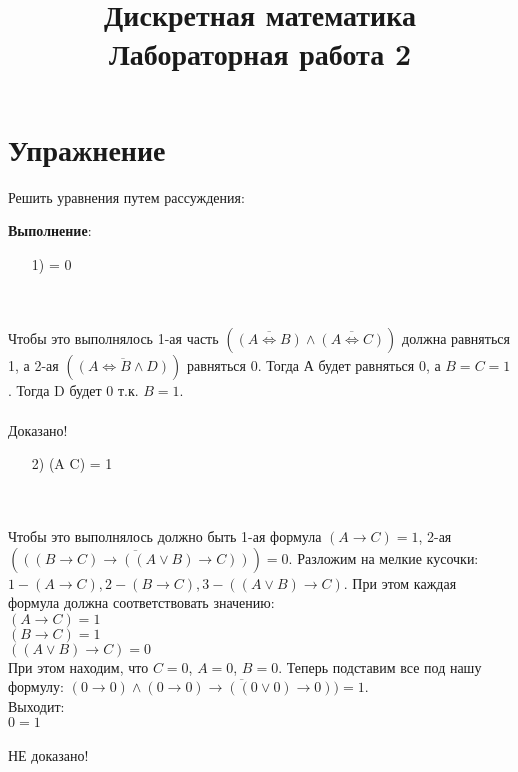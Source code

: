 \documentclass{article}
\title{Дискретная математика \\ Лабораторная работа 2}
\begin{document}
\maketitle

\section{Упражнение}

Решить уравнения путем рассуждения:

\textbf{Выполнение}:
\begin{enumerate}
\item[1)]  \wedge {} \rightarrow {} = 0
\end{enumerate}\\
\\
Чтобы это выполнялось 1-ая часть $(\overline{(A \Longleftrightarrow B)} \wedge \overline{(A \Longleftrightarrow C)})$ должна равняться 1, а 2-ая $(\overline{(A\Longleftrightarrow B \wedge D)})$ равняться 0.
Тогда А будет равняться 0, а $B = C = 1$. Тогда D будет 0 т.к. $B = 1$. \\
\\
Доказано!
\begin{enumerate}
\item[2)] (A \rightarrow C) \wedge {} = 1
\end{enumerate}
\\
\\
Чтобы это выполнялось должно быть 1-ая формула $(A \rightarrow C) = 1$, 2-ая $(\overline{((B \rightarrow C) \rightarrow ((A \vee B) \rightarrow C))}) = 0$. Разложим на мелкие кусочки: $1 - (A \rightarrow C), 2 - (B \rightarrow C), 3 - ((A \vee B) \rightarrow C)$. При этом каждая формула должна соответствовать значению:\\
$(A \rightarrow C) = 1$ \\
$(B \rightarrow C) = 1$ \\
$((A \vee B) \rightarrow C) = 0$ \\
При этом находим, что $C = 0$, $A = 0$, $B = 0$. Теперь подставим все под нашу формулу:
$(0 \rightarrow 0) \wedge \overline{(0 \rightarrow 0) \rightarrow ((0 \vee 0) \rightarrow 0))} = 1$.\\
Выходит:\\
$0 = 1$ \\
\\
НЕ доказано!
\end{document}
